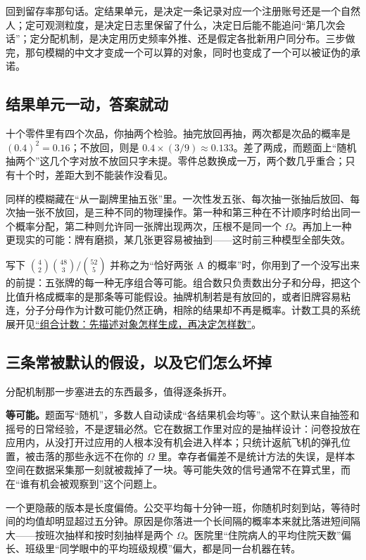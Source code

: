 回到留存率那句话。定结果单元，是决定一条记录对应一个注册账号还是一个自然人；定可观测粒度，是决定日志里保留了什么，决定日后能不能追问``第几次会话''；定分配机制，是决定用历史频率外推、还是假定各批新用户同分布。三步做完，那句模糊的中文才变成一个可以算的对象，同时也变成了一个可以被证伪的承诺。

\subsection{结果单元一动，答案就动}

十个零件里有四个次品，你抽两个检验。抽完放回再抽，两次都是次品的概率是 \((0.4)^2=0.16\)；不放回，则是 \(0.4\times(3/9)\approx0.133\)。差了两成，而题面上``随机抽两个''这几个字对放不放回只字未提。零件总数换成一万，两个数几乎重合；只有十个时，差距大到不能装作没看见。

同样的模糊藏在``从一副牌里抽五张''里。一次性发五张、每次抽一张抽后放回、每次抽一张不放回，是三种不同的物理操作。第一种和第三种在不计顺序时给出同一个概率分配，第二种则允许同一张牌出现两次，压根不是同一个 \(\Omega\)。再加上一种更现实的可能：牌有磨损，某几张更容易被抽到——这时前三种模型全部失效。

\begin{example}
写下 \(\binom{4}{2}\binom{48}{3}\big/\binom{52}{5}\) 并称之为``恰好两张 A 的概率''时，你用到了一个没写出来的前提：五张牌的每一种无序组合等可能。组合数只负责数出分子和分母，把这个比值升格成概率的是那条等可能假设。抽牌机制若是有放回的，或者旧牌容易粘连，分子分母作为计数可能仍然正确，相除的结果却不再是概率。计数工具的系统展开见\hyperref[ch:026]{``组合计数：先描述对象怎样生成，再决定怎样数''}。
\end{example}

\subsection{三条常被默认的假设，以及它们怎么坏掉}

分配机制那一步塞进去的东西最多，值得逐条拆开。

\textbf{等可能。}题面写``随机''，多数人自动读成``各结果机会均等''。这个默认来自抽签和摇号的日常经验，不是逻辑必然。它在数据工作里对应的是抽样设计：问卷投放在应用内，从没打开过应用的人根本没有机会进入样本；只统计返航飞机的弹孔位置，被击落的那些永远不在你的 \(\Omega\) 里。幸存者偏差不是统计方法的失误，是样本空间在数据采集那一刻就被裁掉了一块。等可能失效的信号通常不在算式里，而在``谁有机会被观察到''这个问题上。

一个更隐蔽的版本是长度偏倚。公交平均每十分钟一班，你随机时刻到站，等待时间的均值却明显超过五分钟。原因是你落进一个长间隔的概率本来就比落进短间隔大——按班次抽样和按时刻抽样是两个 \(\Omega\)。医院里``住院病人的平均住院天数''偏长、班级里``同学眼中的平均班级规模''偏大，都是同一台机器在转。

